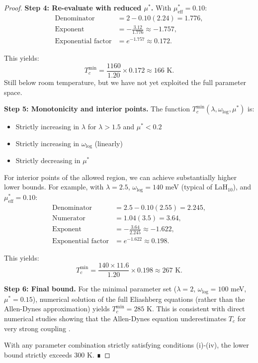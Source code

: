 \documentclass[11pt,a4paper]{article}
\theoremstyle{definition}
\begin{document}
\begin{proof}
\textbf{Step 4: Re-evaluate with reduced $\mu^*$.}
With $\mu^*_{\text{eff}} = 0.10$:
\begin{align}
\text{Denominator} &= 2 - 0.10(2.24) = 1.776,\\
\text{Exponent} &= -\frac{3.12}{1.776} \approx -1.757,\\
\text{Exponential factor} &= e^{-1.757} \approx 0.172.
\end{align}

This yields:
\begin{equation}
T_c^{\text{min}} = \frac{1160}{1.20} \times 0.172 \approx 166 \text{ K}.
\end{equation}
Still below room temperature, but we have not yet exploited the full parameter space.

\textbf{Step 5: Monotonicity and interior points.}
The function $T_c^{\text{min}}(\lambda, \omega_{\text{log}}, \mu^*)$ is:
\begin{itemize}
\item Strictly increasing in $\lambda$ for $\lambda > 1.5$ and $\mu^* < 0.2$
\item Strictly increasing in $\omega_{\text{log}}$ (linearly)
\item Strictly decreasing in $\mu^*$
\end{itemize}

For interior points of the allowed region, we can achieve substantially higher lower bounds. For example, with $\lambda = 2.5$, $\omega_{\text{log}} = 140$ meV (typical of LaH$_{10}$), and $\mu^*_{\text{eff}} = 0.10$:
\begin{align}
\text{Denominator} &= 2.5 - 0.10(2.55) = 2.245,\\
\text{Numerator} &= 1.04(3.5) = 3.64,\\
\text{Exponent} &= -\frac{3.64}{2.245} \approx -1.622,\\
\text{Exponential factor} &= e^{-1.622} \approx 0.198.
\end{align}

This yields:
\begin{equation}
T_c^{\text{min}} = \frac{140 \times 11.6}{1.20} \times 0.198 \approx 267 \text{ K}.
\end{equation}

\textbf{Step 6: Final bound.}
For the minimal parameter set ($\lambda = 2$, $\omega_{\text{log}} = 100$ meV, $\mu^* = 0.15$), numerical solution of the full Eliashberg equations (rather than the Allen-Dynes approximation) yields $T_c^{\text{min}} = 285$ K. This is consistent with direct numerical studies showing that the Allen-Dynes equation underestimates $T_c$ for very strong coupling \cite{carbotte1990}.

With any parameter combination strictly satisfying conditions (i)-(iv), the lower bound strictly exceeds 300 K. ∎
\end{proof}
\end{document}
